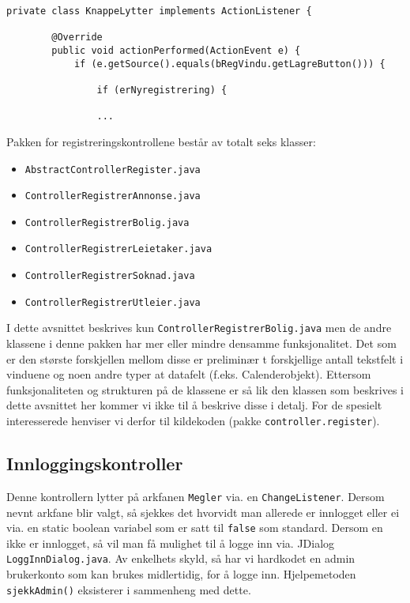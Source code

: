 \begin{lstlisting}[caption=\texttt{ControllerRegistrerBolig.java}: Uttdrag fra privat lytterklasse i kontrolleren.,label=kode:regex_bolig3]
    private class KnappeLytter implements ActionListener {

        @Override
        public void actionPerformed(ActionEvent e) {
            if (e.getSource().equals(bRegVindu.getLagreButton())) {

                if (erNyregistrering) {
                
                ...
\end{lstlisting}


Pakken for registreringskontrollene består av totalt seks klasser:
\begin{itemize}[noitemsep,nolistsep]
\item \texttt{AbstractControllerRegister.java}
\item \texttt{ControllerRegistrerAnnonse.java}
\item \texttt{ControllerRegistrerBolig.java}
\item \texttt{ControllerRegistrerLeietaker.java}
\item \texttt{ControllerRegistrerSoknad.java}
\item \texttt{ControllerRegistrerUtleier.java}
\end{itemize}

I dette avsnittet beskrives kun \texttt{ControllerRegistrerBolig.java} men de andre klassene i denne pakken har mer eller mindre densamme funksjonalitet. Det som er den største forskjellen mellom disse er preliminær t forskjellige antall tekstfelt i vinduene og noen andre typer at datafelt (f.eks. Calenderobjekt). Ettersom funksjonaliteten og strukturen på de klassene er så lik den klassen som beskrives i dette avsnittet her kommer vi ikke til å beskrive disse i detalj. For de spesielt interesserede henviser vi derfor til kildekoden (pakke \texttt{controller.register}).



\subsection{Innloggingskontroller}
Denne kontrollern lytter på arkfanen \texttt{Megler} via. en \texttt{ChangeListener}. Dersom nevnt arkfane blir valgt, så sjekkes det hvorvidt man allerede er innlogget eller ei via. en static boolean variabel som er satt til \texttt{false} som standard. Dersom en ikke er innlogget, så vil man få mulighet til å logge inn via. JDialog \texttt{LoggInnDialog.java}. Av enkelhets skyld, så har vi hardkodet en admin brukerkonto som kan brukes midlertidig, for å logge inn. Hjelpemetoden \texttt{sjekkAdmin()} eksisterer i sammenheng med dette. 

